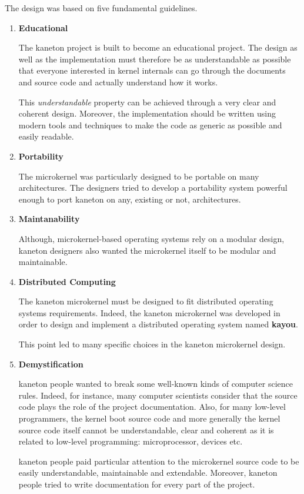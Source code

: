 The design was based on five fundamental guidelines.

\begin{enumerate}
  \item
    \textbf{Educational}

    \-

    The kaneton project is built to become an educational project. The design
    as well as the implementation must therefore be as understandable as
    possible that everyone interested in kernel internals can go through the
    documents and source code and actually understand how it works.

    \-

    This \textit{understandable} property can be achieved through a very clear
    and coherent design. Moreover, the implementation should be written using
    modern tools and techniques to make the code as generic as possible and
    easily readable.
  \item
    \textbf{Portability}

    \-

    The microkernel was particularly designed to be portable on many
    architectures. The designers tried to develop a portability system
    powerful enough to port kaneton on any, existing or not, architectures.
  \item
    \textbf{Maintanability}

    \-

    Although, microkernel-based operating systems rely on a modular design,
    kaneton designers also wanted the microkernel itself to be modular and
    maintainable.
  \item
    \textbf{Distributed Computing}

    \-

    The kaneton microkernel must be designed to fit distributed operating
    systems requirements. Indeed, the kaneton microkernel was developed in
    order to design and implement a distributed operating system named
    \textbf{kayou}.

    \-

    This point led to many specific choices in the kaneton microkernel design.
  \item
    \textbf{Demystification}

    \-

    kaneton people wanted to break some well-known kinds of computer
    science rules. Indeed, for instance, many computer scientists consider that
    the source code plays the role of the project documentation. Also, for many
    low-level programmers, the kernel boot source code and more generally the
    kernel source code itself cannot be understandable, clear and coherent as
    it is related to low-level programming: microprocessor, devices etc.

    kaneton people paid particular attention to the microkernel source code to
    be easily understandable, maintainable and extendable. Moreover, kaneton
    people tried to write documentation for every part of the project.
\end{enumerate}

